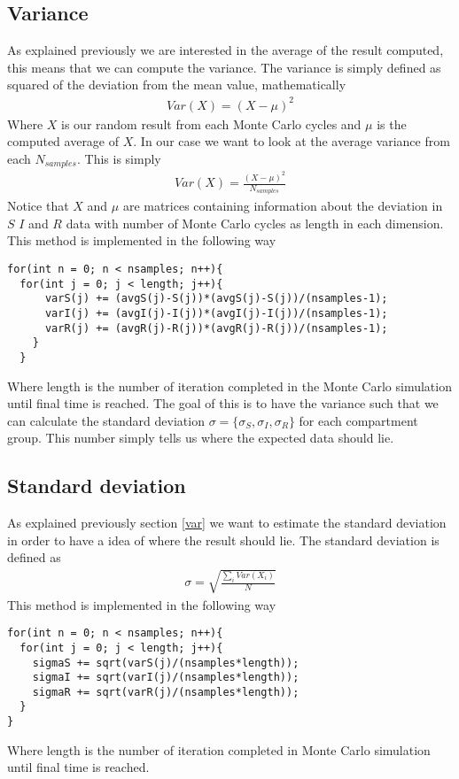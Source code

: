 \documentclass[a4paper, 10pt]{article}
\begin{document}
\subsection{Variance \label{var}} As explained previously we are interested in the average of the result computed,
this means that we can compute the variance. The variance is simply defined as squared of the deviation from the mean value,
mathematically
\begin{align}
  Var(X) = (X-\mu)^{2}
\end{align}
Where $X$ is our random result from each Monte Carlo cycles and $\mu$ is the computed
average of $X$. In our case we want to look at the average variance from each $N_{samples}$.
This is simply
\begin{align}
  Var(X) = \frac{(X-\mu)^{2}}{N_{samples}}
\end{align}
Notice that $X$ and $\mu$ are matrices containing information about the deviation in $S$
$I$ and $R$ data with number of Monte Carlo cycles as length in each dimension. This method is implemented in the following way
\begin{lstlisting}
for(int n = 0; n < nsamples; n++){
  for(int j = 0; j < length; j++){
      varS(j) += (avgS(j)-S(j))*(avgS(j)-S(j))/(nsamples-1);
      varI(j) += (avgI(j)-I(j))*(avgI(j)-I(j))/(nsamples-1);
      varR(j) += (avgR(j)-R(j))*(avgR(j)-R(j))/(nsamples-1);
    }
  }
\end{lstlisting}
Where length is the number of iteration completed in the Monte Carlo simulation until final time is reached.
The goal of this is to have the variance such that we can calculate the standard deviation $\sigma = \{\sigma_{S},\sigma_{I},\sigma_{R}\}$ for each
compartment group. This number simply tells us where the expected data should lie.
\subsection{Standard deviation} As explained previously section \eqref{var} we want to estimate the standard deviation
in order to have a idea of where the result should lie. The standard deviation is defined as
\begin{align}
  \sigma = \sqrt{\frac{\sum_{i}Var(X_{i})}{N}}
\end{align}
This method is implemented in the following way
\begin{lstlisting}
for(int n = 0; n < nsamples; n++){
  for(int j = 0; j < length; j++){
    sigmaS += sqrt(varS(j)/(nsamples*length));
    sigmaI += sqrt(varI(j)/(nsamples*length));
    sigmaR += sqrt(varR(j)/(nsamples*length));
  }
}
\end{lstlisting}
Where length is the number of iteration completed in Monte Carlo simulation until final time is reached.
\end{document}
